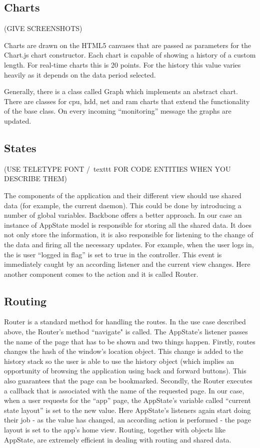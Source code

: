 \documentclass{l3proj}
\begin{document}
\subsection{Charts}

(GIVE SCREENSHOTS)

Charts are drawn on the HTML5 canvases that are passed as parameters for the Chart.js chart constructor. Each chart is capable of showing a history of a custom length. For real-time charts this is 20 points. For the history this value varies heavily as it depends on the data period selected.

Generally, there is a class called Graph which implements an abstract chart. There are classes for cpu, hdd, net and ram charts that extend the functionality of the base class. On every incoming ``monitoring'' message the graphs are updated.

\subsection{States}

(USE TELETYPE FONT /\ texttt FOR CODE ENTITIES WHEN YOU DESCRIBE THEM)

The components of the application and their different view should use shared data (for example, the current daemon). This could be done by introducing a number of global variables. Backbone offers a better approach. In our case an instance of AppState model is responsible for storing all the shared data. It does not only store the information, it is also responsible for listening to the change of the data and firing all the necessary updates. For example, when the user logs in, the is user ``logged in flag'' is set to true in the controller. This event is immediately caught by an according listener and the current view changes. Here another component comes to the action and it is called Router.

\subsection{Routing}

Router is a standard method for handling the routes. In the use case described above, the Router's method ``navigate" is called. The AppState's listener passes the name of the page that has to be shown and two things happen. Firstly, routes changes the hash of the window's location object. This change is added to the history stack so the user is able to use the history object (which implies an opportunity of browsing the application using back and forward buttons). This also guarantees that the page can be bookmarked. Secondly, the Router executes a callback that is associated with the name of the requested page. In our case, when a user requests for the ``app'' page, the AppState's variable called ``current state layout'' is set to the new value. Here AppState's listeners again start doing their job - as the value has changed, an according action is performed - the page layout is set to the app's home view. Routing, together with objects like AppState, are extremely efficient in dealing with routing and shared data.
\end{document}
